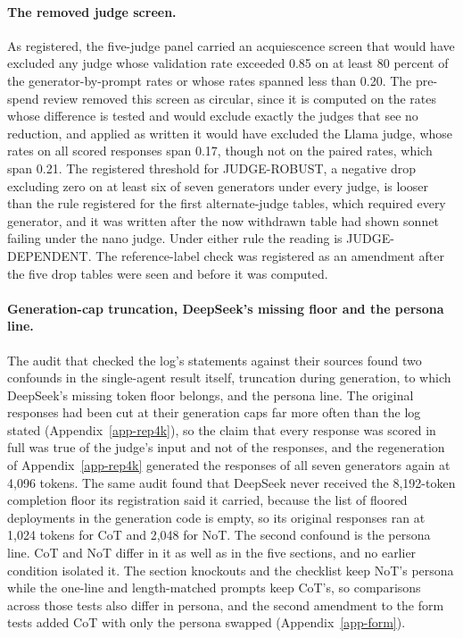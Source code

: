 \paragraph{The removed judge screen.}
As registered, the five-judge panel carried an acquiescence screen that
would have excluded any judge whose validation rate
exceeded 0.85 on at least 80 percent of the generator-by-prompt rates or whose
rates spanned less than 0.20. The pre-spend review removed this screen as
circular, since it is computed on the rates whose difference is tested and
would exclude exactly the judges that see no reduction, and applied as written
it would have excluded the Llama judge, whose rates on all scored responses
span 0.17, though not on the paired rates, which span 0.21.
The registered threshold for JUDGE-ROBUST, a negative drop excluding zero on
at least six of seven generators under every judge, is looser than the rule
registered for the first alternate-judge tables, which required every
generator, and it was written after the now withdrawn table had shown sonnet
failing under the nano judge. Under either
rule the reading is JUDGE-DEPENDENT. The reference-label check was registered
as an amendment after the five drop tables were seen and before it was
computed.

\paragraph{Generation-cap truncation, DeepSeek's missing floor and the persona line.}
The audit that checked the log's statements against their sources found two
confounds in the single-agent result itself, truncation during generation, to
which DeepSeek's missing token floor belongs, and the persona line. The
original responses had been cut at their generation caps far more often than
the log stated (Appendix~\ref{app-rep4k}), so the claim that every response
was scored in full was true of the judge's input and not of the responses,
and the regeneration of Appendix~\ref{app-rep4k} generated the responses of
all seven generators again at 4,096 tokens.
The same audit found that DeepSeek never received the 8,192-token completion
floor its registration said it carried, because the list of floored
deployments in the generation code is empty, so its original responses ran at
1,024 tokens for CoT and 2,048 for NoT.
The second confound is the persona line. CoT and NoT differ in it as well as
in the five sections, and no earlier condition isolated it. The section
knockouts and the checklist keep NoT's persona while the one-line and
length-matched prompts keep CoT's, so comparisons across those tests also
differ in persona, and the second amendment to the form tests added CoT with
only the persona swapped
(Appendix~\ref{app-form}).

